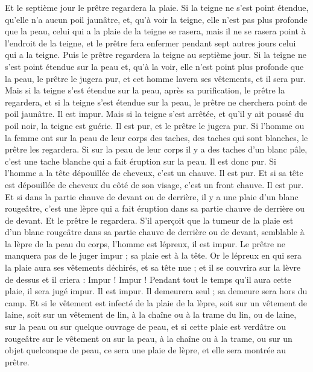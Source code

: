 \begin{multicols}{2}
Et le septième jour le prêtre regardera la plaie. Si la teigne ne s'est point étendue, qu'elle n'a aucun poil jaunâtre, et, qu'à voir la teigne, elle n'est pas plus profonde que la peau,
celui qui a la plaie de la teigne se rasera, mais il ne se rasera point à l'endroit de la teigne, et le prêtre fera enfermer pendant sept autres jours celui qui a la teigne.
Puis le prêtre regardera la teigne au septième jour. Si la teigne ne s'est point étendue sur la peau et, qu'à la voir, elle n'est point plus profonde que la peau, le prêtre le jugera pur, et cet homme lavera ses vêtements, et il sera pur.
Mais si la teigne s'est étendue sur la peau, après sa purification, le prêtre la regardera,
et si la teigne s'est étendue sur la peau, le prêtre ne cherchera point de poil jaunâtre. Il est impur.
Mais si la teigne s'est arrêtée, et qu'il y ait poussé du poil noir, la teigne est guérie. Il est pur, et le prêtre le jugera pur.
Si l'homme ou la femme ont sur la peau de leur corps des taches, des taches qui sont blanches,
le prêtre les regardera. Si sur la peau de leur corps il y a des taches d'un blanc pâle, c'est une tache blanche qui a fait éruption sur la peau. Il est donc pur.
Si l'homme a la tête dépouillée de cheveux, c'est un chauve. Il est pur.
Et si sa tête est dépouillée de cheveux du côté de son visage, c'est un front chauve. Il est pur.
Et si dans la partie chauve de devant ou de derrière, il y a une plaie d'un blanc rougeâtre, c'est une lèpre qui a fait éruption dans sa partie chauve de derrière ou de devant.
Et le prêtre le regardera. S'il aperçoit que la tumeur de la plaie est d'un blanc rougeâtre dans sa partie chauve de derrière ou de devant, semblable à la lèpre de la peau du corps,
l'homme est lépreux, il est impur. Le prêtre ne manquera pas de le juger impur ; sa plaie est à la tête.
Or le lépreux en qui sera la plaie aura ses vêtements déchirés, et sa tête nue ; et il se couvrira sur la lèvre de dessus et il criera : Impur ! Impur !
Pendant tout le temps qu'il aura cette plaie, il sera jugé impur. Il est impur. Il demeurera seul ; sa demeure sera hors du camp.
Et si le vêtement est infecté de la plaie de la lèpre, soit sur un vêtement de laine, soit sur un vêtement de lin,
à la chaîne ou à la trame du lin, ou de laine, sur la peau ou sur quelque ouvrage de peau,
et si cette plaie est verdâtre ou rougeâtre sur le vêtement ou sur la peau, à la chaîne ou à la trame, ou sur un objet quelconque de peau, ce sera une plaie de lèpre, et elle sera montrée au prêtre.

\end{multicols}

